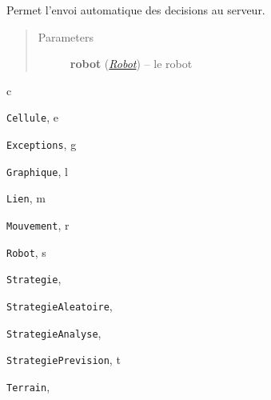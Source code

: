 \documentclass[letterpaper,10pt,english]{sphinxmanual}
\begin{document}

\begin{fulllineitems}
\label{index:lolipooo.sendDecisions}
Permet l'envoi automatique des decisions au serveur.
\begin{quote}\begin{description}
\item[{Parameters}] \leavevmode
\textbf{robot} ({\hyperref[index:module-Robot]{\emph{Robot}}}) -- le robot

\end{description}\end{quote}

\end{fulllineitems}



\renewcommand{\indexname}{Python Module Index}
\begin{theindex}
\def\bigletter#1{{\Large\sffamily#1}\nopagebreak\vspace{1mm}}
\bigletter{c}
\item {\texttt{Cellule}}, \pageref{index:module-Cellule}
\indexspace
\bigletter{e}
\item {\texttt{Exceptions}}, \pageref{index:module-Exceptions}
\indexspace
\bigletter{g}
\item {\texttt{Graphique}}, \pageref{index:module-Graphique}
\indexspace
\bigletter{l}
\item {\texttt{Lien}}, \pageref{index:module-Lien}
\indexspace
\bigletter{m}
\item {\texttt{Mouvement}}, \pageref{index:module-Mouvement}
\indexspace
\bigletter{r}
\item {\texttt{Robot}}, \pageref{index:module-Robot}
\indexspace
\bigletter{s}
\item {\texttt{Strategie}}, \pageref{index:module-Strategie}
\item {\texttt{StrategieAleatoire}}, \pageref{index:module-StrategieAleatoire}
\item {\texttt{StrategieAnalyse}}, \pageref{index:module-StrategieAnalyse}
\item {\texttt{StrategiePrevision}}, \pageref{index:module-StrategiePrevision}
\indexspace
\bigletter{t}
\item {\texttt{Terrain}}, \pageref{index:module-Terrain}
\end{theindex}

\renewcommand{\indexname}{Index}
\printindex
\end{document}

